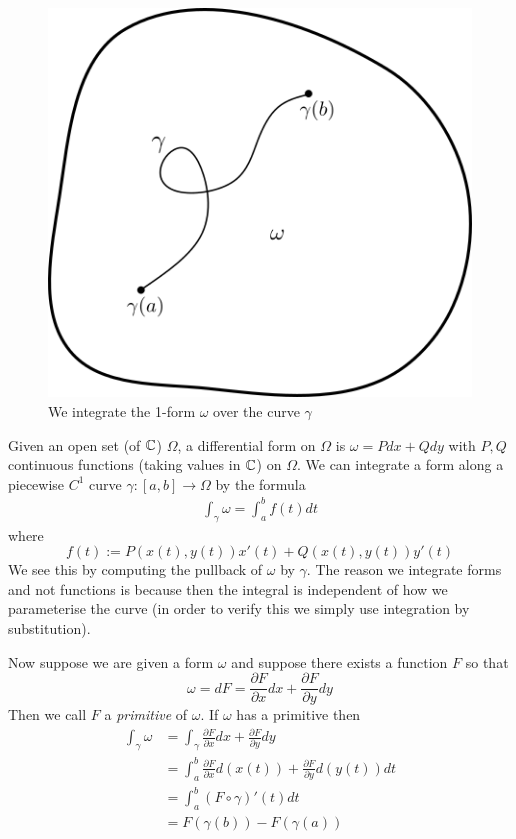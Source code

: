 \begin{figure}[ht]
    \centering
    \includegraphics[scale=0.85]{Images/integrating_forms.png}
    \caption{We integrate the 1-form $\omega$ over the curve $\gamma$}
    \label{fig:integrating-forms}
\end{figure}

Given an open set (of $\mathbb{C}$) $\Omega$, a differential form on $\Omega$ is $\omega = Pdx + Qdy$ with $P, Q$ continuous functions (taking values in $\mathbb{C}$) on $\Omega$. We can integrate a form along a piecewise $C^1$ curve $\gamma: [a, b] \to \Omega$ by the formula
\begin{align*}
    \int_\gamma \omega = \int_a^b f(t) dt
\end{align*}
where
$$f(t) := P(x(t), y(t))x'(t) + Q(x(t), y(t)) y'(t)$$
We see this by computing the pullback of $\omega$ by $\gamma$. The reason we integrate forms and not functions is because then the integral is independent of how we parameterise the curve (in order to verify this we simply use integration by substitution).

Now suppose we are given a form $\omega$ and suppose there exists a function $F$ so that
$$\omega = dF = \frac{\partial F}{\partial x}dx + \frac{\partial F}{\partial y}dy$$
Then we call $F$ a \textit{primitive} of $\omega$. If $\omega$ has a primitive then
\begin{align*}
    \int_\gamma \omega &= \int_\gamma \frac{\partial F}{\partial x}dx + \frac{\partial F}{\partial y}dy\\
    &= \int_a^b \frac{\partial F}{\partial x}d(x(t)) + \frac{\partial F}{\partial y}d(y(t)) dt\\
    &= \int_a^b (F \circ \gamma)'(t) dt\\
    &= F(\gamma(b)) - F(\gamma(a))
\end{align*}

